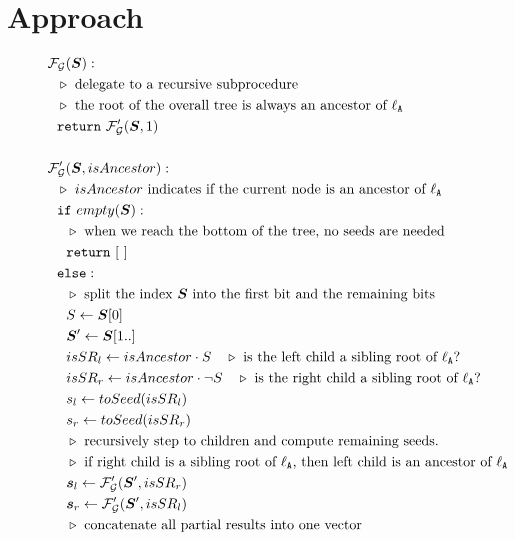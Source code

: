 \section{Approach}\label{sec:approach}

\begin{figure}
  \begin{align*}
    &\func_\gadget(\vec S):\\
    &~~\codecomment{delegate to a recursive subprocedure}\\
    &~~\codecomment{the root of the overall tree is always an ancestor
    of \aid}\\
    &~~\creturn~\func_\gadget'(\vec S, 1)\\
    \\
    &\func_\gadget'(\vec S, isAncestor):\\
    &~~\codecomment{$isAncestor$ indicates if the current node is an ancestor of \aid}\\
    &~~\cif~empty(\vec S):\\
    &~~~~\codecomment{when we reach the bottom of the tree, no
    seeds are needed}\\
    &~~~~\creturn~[~]\\
    &~~\celse:\\
    &~~~~\codecomment{split the index $\vec S$ into the first bit and
    the remaining bits}\\
    &~~~~S \gets \vec S[0]\\
    &~~~~\vec S' \gets \vec S[1..]\\
    &~~~~isSR_l \gets isAncestor\cdot S \quad\codecomment{is the left
    child a sibling root of \aid?}\\
    &~~~~isSR_r \gets isAncestor\cdot \neg S \quad \codecomment{is the
    right child a sibling root of \aid?}\\
    &~~~~s_l \gets toSeed(isSR_l)\\
    &~~~~s_r \gets toSeed(isSR_r)\\
    &~~~~\codecomment{recursively step to children and compute remaining seeds}.\\
    &~~~~\codecomment{if right child is a sibling root of \aid,
    then left child is an ancestor of \aid}\\
    &~~~~\vec s_l \gets \func_\gadget'(\vec S', isSR_r)\\
    &~~~~\vec s_r \gets \func_\gadget'(\vec S', isSR_l)\\
    &~~~~\codecomment{concatenate all partial results into one
    vector}\\

\end{align*}
\end{figure}
